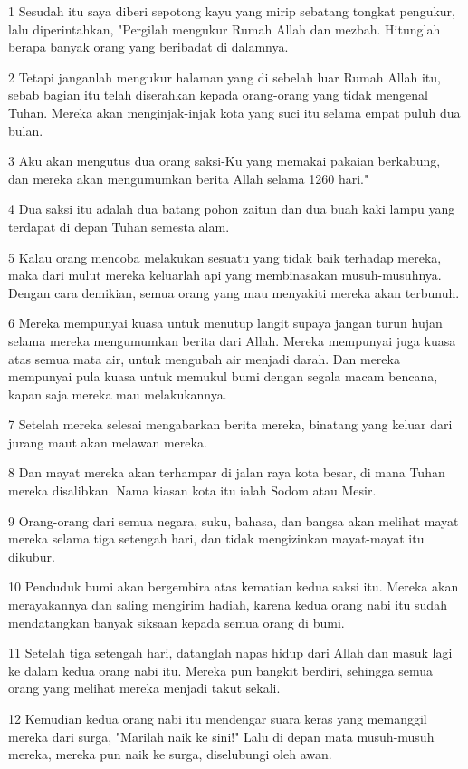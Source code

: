 \par 1 Sesudah itu saya diberi sepotong kayu yang mirip sebatang tongkat pengukur, lalu diperintahkan, "Pergilah mengukur Rumah Allah dan mezbah. Hitunglah berapa banyak orang yang beribadat di dalamnya.
\par 2 Tetapi janganlah mengukur halaman yang di sebelah luar Rumah Allah itu, sebab bagian itu telah diserahkan kepada orang-orang yang tidak mengenal Tuhan. Mereka akan menginjak-injak kota yang suci itu selama empat puluh dua bulan.
\par 3 Aku akan mengutus dua orang saksi-Ku yang memakai pakaian berkabung, dan mereka akan mengumumkan berita Allah selama 1260 hari."
\par 4 Dua saksi itu adalah dua batang pohon zaitun dan dua buah kaki lampu yang terdapat di depan Tuhan semesta alam.
\par 5 Kalau orang mencoba melakukan sesuatu yang tidak baik terhadap mereka, maka dari mulut mereka keluarlah api yang membinasakan musuh-musuhnya. Dengan cara demikian, semua orang yang mau menyakiti mereka akan terbunuh.
\par 6 Mereka mempunyai kuasa untuk menutup langit supaya jangan turun hujan selama mereka mengumumkan berita dari Allah. Mereka mempunyai juga kuasa atas semua mata air, untuk mengubah air menjadi darah. Dan mereka mempunyai pula kuasa untuk memukul bumi dengan segala macam bencana, kapan saja mereka mau melakukannya.
\par 7 Setelah mereka selesai mengabarkan berita mereka, binatang yang keluar dari jurang maut akan melawan mereka.
\par 8 Dan mayat mereka akan terhampar di jalan raya kota besar, di mana Tuhan mereka disalibkan. Nama kiasan kota itu ialah Sodom atau Mesir.
\par 9 Orang-orang dari semua negara, suku, bahasa, dan bangsa akan melihat mayat mereka selama tiga setengah hari, dan tidak mengizinkan mayat-mayat itu dikubur.
\par 10 Penduduk bumi akan bergembira atas kematian kedua saksi itu. Mereka akan merayakannya dan saling mengirim hadiah, karena kedua orang nabi itu sudah mendatangkan banyak siksaan kepada semua orang di bumi.
\par 11 Setelah tiga setengah hari, datanglah napas hidup dari Allah dan masuk lagi ke dalam kedua orang nabi itu. Mereka pun bangkit berdiri, sehingga semua orang yang melihat mereka menjadi takut sekali.
\par 12 Kemudian kedua orang nabi itu mendengar suara keras yang memanggil mereka dari surga, "Marilah naik ke sini!" Lalu di depan mata musuh-musuh mereka, mereka pun naik ke surga, diselubungi oleh awan.

